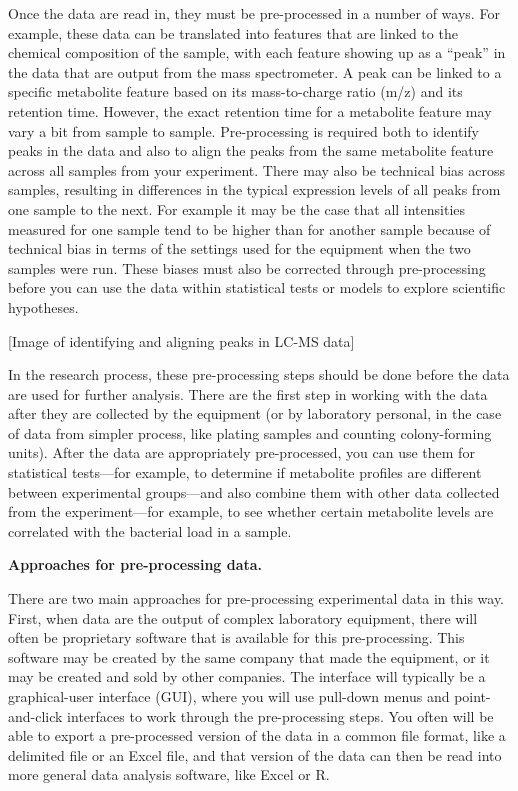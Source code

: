 \documentclass[]{tufte-book}
\begin{document}
Once the data are read in, they must be pre-processed in a number of ways. For
example, these data can be translated into features that are linked to the
chemical composition of the sample, with each feature showing up as a ``peak'' in
the data that are output from the mass spectrometer. A peak can be linked to a
specific metabolite feature based on its mass-to-charge ratio (m/z) and its
retention time. However, the exact retention time for a metabolite feature may
vary a bit from sample to sample. Pre-processing is required both to identify
peaks in the data and also to align the peaks from the same metabolite feature
across all samples from your experiment. There may also be technical bias across
samples, resulting in differences in the typical expression levels of all peaks
from one sample to the next. For example it may be the case that all intensities
measured for one sample tend to be higher than for another sample because of
technical bias in terms of the settings used for the equipment when the two
samples were run. These biases must also be corrected through pre-processing
before you can use the data within statistical tests or models to explore scientific hypotheses.

{[}Image of identifying and aligning peaks in LC-MS data{]}

In the research process, these pre-processing steps should be done before
the data are used for further analysis. There are the first step in working
with the data after they are collected by the equipment (or by laboratory
personal, in the case of data from simpler process, like plating samples
and counting colony-forming units). After the data are appropriately
pre-processed, you can use them for statistical tests---for example, to
determine if metabolite profiles are different between experimental groups---and
also combine them with other data collected from the experiment---for example,
to see whether certain metabolite levels are correlated with the bacterial
load in a sample.

\textbf{Approaches for pre-processing data.}

There are two main approaches for pre-processing experimental data in this
way. First, when data are the output of complex laboratory equipment, there
will often be proprietary software that is available for this pre-processing.
This software may be created by the same company that made the equipment, or
it may be created and sold by other companies. The interface will typically
be a graphical-user interface (GUI), where you will use pull-down menus and
point-and-click interfaces to work through the pre-processing steps. You
often will be able to export a pre-processed version of the data in a
common file format, like a delimited file or an Excel file, and that version
of the data can then be read into more general data analysis software, like
Excel or R.
\end{document}
